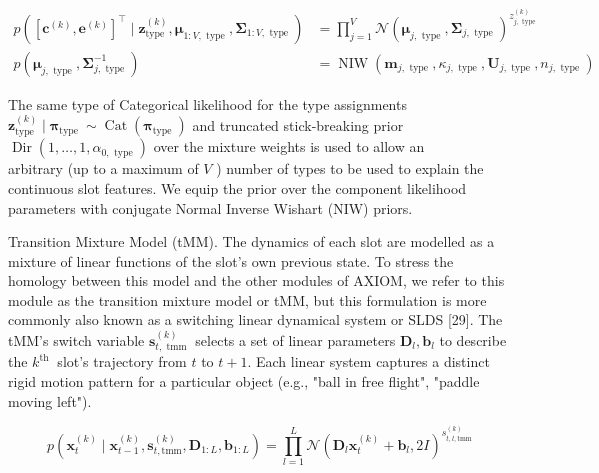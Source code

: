 \documentclass[10pt]{article}
\begin{document}
\begin{align*}
p\left(\left[\mathbf{c}^{(k)}, \mathbf{e}^{(k)}\right]^{\top} \mid \mathbf{z}_{\text {type }}^{(k)}, \boldsymbol{\mu}_{1: V, \text { type }}, \boldsymbol{\Sigma}_{1: V, \text { type }}\right) & =\prod_{j=1}^{V} \mathcal{N}\left(\boldsymbol{\mu}_{j, \text { type }}, \boldsymbol{\Sigma}_{j, \text { type }}\right)^{z_{j, \text { type }}^{(k)}}  \tag{3}\\
p\left(\boldsymbol{\mu}_{j, \text { type }}, \boldsymbol{\Sigma}_{j, \text { type }}^{-1}\right) & =\operatorname{NIW}\left(\mathbf{m}_{j, \text { type }}, \kappa_{j, \text { type }}, \mathbf{U}_{j, \text { type }}, n_{j, \text { type }}\right) \tag{4}
\end{align*}


The same type of Categorical likelihood for the type assignments $\mathbf{z}_{\text {type }}^{(k)} \mid \boldsymbol{\pi}_{\text {type }} \sim \operatorname{Cat}\left(\boldsymbol{\pi}_{\text {type }}\right)$ and truncated stick-breaking prior $\operatorname{Dir}\left(1, \ldots, 1, \alpha_{0, \text { type }}\right)$ over the mixture weights is used to allow an\\
arbitrary (up to a maximum of $V$ ) number of types to be used to explain the continuous slot features. We equip the prior over the component likelihood parameters with conjugate Normal Inverse Wishart (NIW) priors.

Transition Mixture Model (tMM). The dynamics of each slot are modelled as a mixture of linear functions of the slot's own previous state. To stress the homology between this model and the other modules of AXIOM, we refer to this module as the transition mixture model or tMM, but this formulation is more commonly also known as a switching linear dynamical system or SLDS [29]. The tMM's switch variable $\mathbf{s}_{t, \text { tmm }}^{(k)}$ selects a set of linear parameters $\boldsymbol{D}_{l}, \boldsymbol{b}_{l}$ to describe the $k^{\text {th }}$ slot's trajectory from $t$ to $t+1$. Each linear system captures a distinct rigid motion pattern for a particular object (e.g., "ball in free flight", "paddle moving left").


\begin{equation*}
p\left(\mathbf{x}_{t}^{(k)} \mid \mathbf{x}_{t-1}^{(k)}, \mathbf{s}_{t, \mathrm{tmm}}^{(k)}, \boldsymbol{D}_{1: L}, \boldsymbol{b}_{1: L}\right)=\prod_{l=1}^{L} \mathcal{N}\left(\boldsymbol{D}_{l} \mathbf{x}_{t}^{(k)}+\boldsymbol{b}_{l}, 2 I\right)^{s_{t, l, \mathrm{tmm}}^{(k)}} \tag{5}
\end{equation*}
\end{document}
